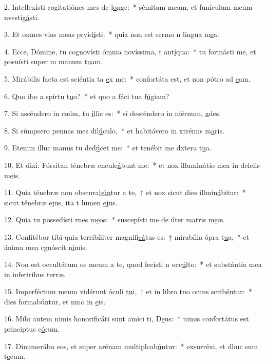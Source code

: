 2. Intellexísti cogitatiónes mes de l\uline{o}nge:~* sémitam meam, et funículum meum nvestig\uline{á}sti.\par 
3. Et omnes vias meas prvid\uline{í}sti:~* quia non est sermo n lingua m\uline{e}a.\par 
4. Ecce, Dómine, tu cognovísti ómnia novíssima, t ant\uline{í}qua:~* tu formásti me, et posuísti super m manum t\uline{u}am.\par 
5. Mirábilis facta est sciéntia ta \uline{e}x me:~* confortáta est, et non pótro ad \uline{e}am.\par 
6. Quo ibo a spírtu t\uline{u}o?~* et quo a fáci tua f\uline{ú}giam?\par 
7. Si ascéndero in cælm, tu \uline{i}llic es:~* si descéndero in nférnum, \uline{a}des.\par 
8. Si súmpsero pennas mes dil\uline{ú}culo,~* et habitávero in xtrémis m\uline{a}ris.\par 
9. Etenim illuc manus tu ded\uline{ú}cet me:~* et tenébit me dxtera t\uline{u}a.\par 
10. Et dixi: Fórsitan ténebræ cnculc\uline{á}bunt me:~* et nox illuminátio mea in delciis m\uline{e}is.\par 
11. Quia ténebræ non obscura\uline{bún}tur a te,~† et nox sicut dies illmin\uline{á}bitur:~* sicut ténebræ ejus, ita t lumen \uline{e}jus.\par 
12. Quia tu possedísti rnes m\uline{e}os:~* suscepísti me de úter matris m\uline{e}æ.\par 
13. Confitébor tibi quia terribíliter magnifi\uline{cá}tus es:~† mirabília ópra t\uline{u}a,~* et ánima mea cgnóscit n\uline{i}mis.\par 
14. Non est occultátum os meum a te, quod fecísti n occ\uline{ú}lto:~* et substántia mea in inferiribus t\uline{e}rræ.\par 
15. Imperféctum meum vidérunt óculi \uline{tu}i,~† et in libro tuo omns scrib\uline{é}ntur:~* dies formabúntur, et nmo in \uline{e}is.\par 
16. Mihi autem nimis honorificáti sunt amíci ti, D\uline{e}us:~* nimis confortátus est principtus e\uline{ó}rum.\par 
17. Dinumerábo eos, et super arénam multiplcab\uline{ú}ntur:~* exsurréxi, et dhuc sum t\uline{e}cum.\par 
